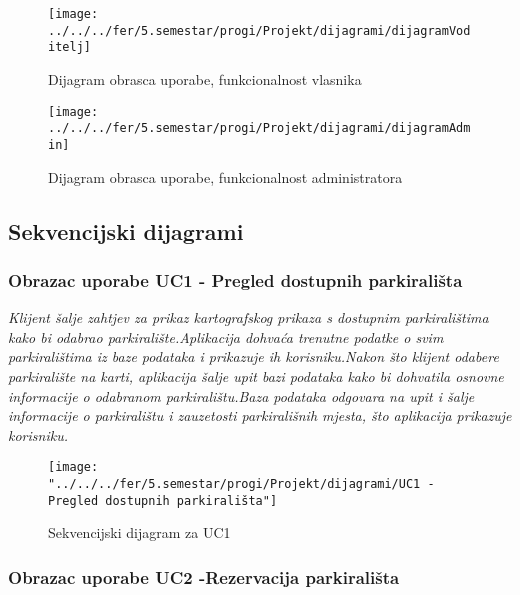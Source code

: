 \begin{figure}
	\centering
	\texttt{[image: ../../../fer/5.semestar/progi/Projekt/dijagrami/dijagramVoditelj]}
	\caption{Dijagram obrasca uporabe, funkcionalnost vlasnika}
	\label{fig:dijagramvoditelj}
\end{figure}

\begin{figure}
	\centering
	\texttt{[image: ../../../fer/5.semestar/progi/Projekt/dijagrami/dijagramAdmin]}
	\caption{Dijagram obrasca uporabe, funkcionalnost administratora}
	\label{fig:dijagramadmin}
\end{figure}

\newpage
	
\subsection{Sekvencijski dijagrami}

\subsubsection{Obrazac uporabe UC1 - Pregled dostupnih parkirališta}

\textit{Klijent šalje zahtjev za prikaz kartografskog prikaza s dostupnim parkiralištima kako bi odabrao parkiralište.Aplikacija dohvaća trenutne podatke o svim parkiralištima iz baze podataka i prikazuje ih korisniku.Nakon što klijent odabere parkiralište na karti, aplikacija šalje upit bazi podataka kako bi dohvatila osnovne informacije o odabranom parkiralištu.Baza podataka odgovara na upit i šalje informacije o parkiralištu i zauzetosti parkirališnih mjesta, što aplikacija prikazuje korisniku.}

\newpage

\begin{figure}
	\centering
	\texttt{[image: "../../../fer/5.semestar/progi/Projekt/dijagrami/UC1 - Pregled dostupnih parkirališta"]}
	\caption{Sekvencijski dijagram za UC1}
	\label{fig:uc1---pregled-dostupnih-parkiralista}
\end{figure}


\subsubsection{Obrazac uporabe UC2 -Rezervacija parkirališta}

